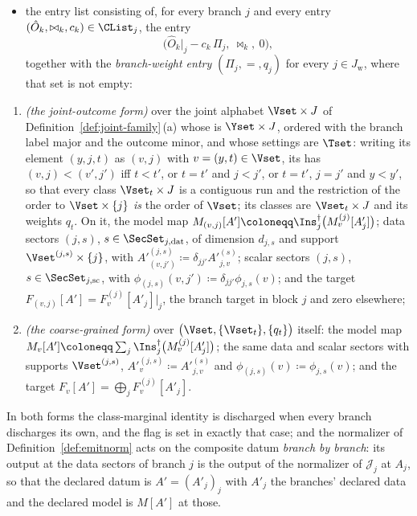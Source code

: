 \begin{theorem}
\begin{itemize}[leftmargin=2.2em]
\item the entry list consisting of, for every branch $j$ and every entry
  $(\hat O_k,\bowtie_k,c_k)\in\CList_j$, the entry
  \begin{equation}\label{eq:instrument-entry}
    \big(\hat O_k|_j-c_k\,\Pi_j,\ \bowtie_k,\ 0\big),
  \end{equation}
  together with the \emph{branch-weight entry} $(\Pi_j,=,q_j)$ for every
  $j\in J_{\mathrm{w}}$, where that set is not empty:
\end{itemize}
\begin{enumerate}[label=(\roman*),leftmargin=3.0em]
\item \emph{(the joint-outcome form)} over the joint alphabet
  $\Vset\times J$ of Definition~\ref{def:joint-family}\,(a) whose
   is $\Yset\times J$, ordered with the branch label
  major and the outcome minor, and whose settings are $\Tset$: writing its
  element $(y,j,t)$ as $(v,j)$ with $v=(y,t)\in\Vset$, its
   has
  $(v,j)<(v',j')$ iff $t<t'$, or $t=t'$ and $j<j'$, or $t=t'$, $j=j'$ and
  $y<y'$, so that every class $\Vset_t\times J$ is a contiguous run and the
  restriction of the order to $\Vset\times\{j\}$ \emph{is} the order of
  $\Vset$; its classes are $\Vset_t\times J$ and its weights $q_t$. On it, the model map
  $M_{(v,j)}[A']\coloneqq\Ins_j^{\dagger}\big(M^{(j)}_v[A'_j]\big)$; data
  sectors $(j,s)$, $s\in\SecSet_{j,\mathrm{dat}}$, of dimension $d_{j,s}$ and
  support $\Vset^{(j,s)}\times\{j\}$, with
  $A'^{(j,s)}_{(v,j')}\coloneqq\delta_{jj'}A'^{(s)}_{j,v}$; scalar sectors
  $(j,s)$, $s\in\SecSet_{j,\mathrm{sc}}$, with
  $\phi_{(j,s)}(v,j')\coloneqq\delta_{jj'}\phi_{j,s}(v)$; and the target
  $F_{(v,j)}[A']=F^{(j)}_v[A'_j]\big|_j$, the branch target in block $j$ and
  zero elsewhere;
\item \emph{(the coarse-grained form)} over $\big(\Vset,\{\Vset_t\},\{q_t\}\big)$
  itself: the model map
  $M_v[A']\coloneqq\sum_{j}\Ins_j^{\dagger}\big(M^{(j)}_v[A'_j]\big)$; the same
  data and scalar sectors with supports $\Vset^{(j,s)}$,
  $A'^{(j,s)}_v\coloneqq A'^{(s)}_{j,v}$ and $\phi_{(j,s)}(v)\coloneqq
  \phi_{j,s}(v)$; and the target $F_v[A']=\bigoplus_jF^{(j)}_v[A'_j]$.
\end{enumerate}
In both forms the class-marginal identity is discharged when every branch
discharges its own, and the flag is set in exactly that case; and the
normalizer of Definition~\ref{def:emitnorm} acts on the composite datum
\emph{branch by branch}: its output at the data sectors of branch $j$ is the
output of the normalizer of $\mathcal{J}_j$ at $A_j$, so that the declared
datum is $A'=(A'_j)_j$ with $A'_j$ the branches' declared data and the
declared model is $M[A']$ at those.
\end{theorem}

